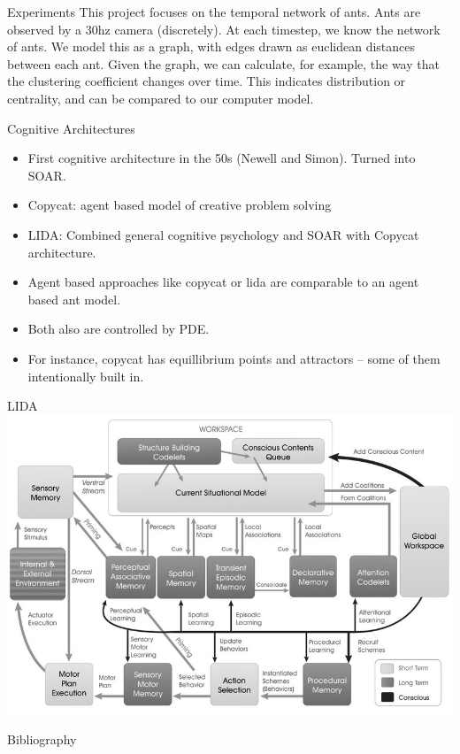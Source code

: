 \documentclass{beamer}
\begin{document}
  \begin{frame}{Experiments}
      This project focuses on the temporal network of ants.
      Ants are observed by a 30hz camera (discretely).
      At each timestep, we know the network of ants. 
      We model this as a graph, with edges drawn as euclidean distances between each ant.
      Given the graph, we can calculate, for example, the way that the clustering coefficient changes over time\cite{saramaki2007generalizations}.
      This indicates distribution or centrality, and can be compared to our computer model.
  \end{frame}

  \begin{frame}{Cognitive Architectures}
      \begin{itemize}
          \item First cognitive architecture in the 50s (Newell and Simon). Turned into SOAR.
          \item Copycat: agent based model of creative problem solving
          \item LIDA: Combined general cognitive psychology and SOAR with Copycat architecture.
          \item Agent based approaches like copycat or lida are comparable to an agent based ant model.
          \item Both also are controlled by PDE.
          \item For instance, copycat has equillibrium points and attractors -- some of them intentionally built in.
      \end{itemize}
  \end{frame}

  \begin{frame}{LIDA}
      \includegraphics[scale=0.3333]{lida}
  \end{frame}

  \begin{frame}{Bibliography}
      
  \end{frame}
\end{document}

